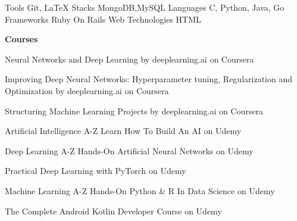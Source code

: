 



  \begin{cvskills}
  \cvskill
    {Tools}
    {Git, LaTeX} 
  \cvskill
    {Stacks}
    {MongoDB,MySQL}
  \cvskill
      {Languages}
      {C, Python, Java, Go}
  \cvskill
    {Frameworks}
    {Ruby On Rails}
  \cvskill
    {Web Technologies}
    {HTML}
    

  \end{cvskills}


  \begin{cventries}

 \cventry
 {\bf Courses}
 {}
 {}
 {}
    {
      \begin{cvitems} %
        \item {Neural Networks and Deep Learning by deeplearning.ai on Coursera}
        \item {Improving Deep Neural Networks: Hyperparameter tuning, Regularization and Optimization by deeplearning.ai on Coursera}
        \item {Structuring Machine Learning Projects by deeplearning.ai on Coursera}
        \item {Artificial Intelligence A-Z Learn How To Build An AI on Udemy}
        \item {Deep Learning A-Z Hands-On Artificial Neural Networks on Udemy}
        \item {Practical Deep Learning with PyTorch on Udemy}
        \item {Machine Learning A-Z Hands-On Python \& R In Data Science on Udemy}
        \item {The Complete Android Kotlin Developer Course on Udemy}
      \end{cvitems}
    }
\end{cventries}